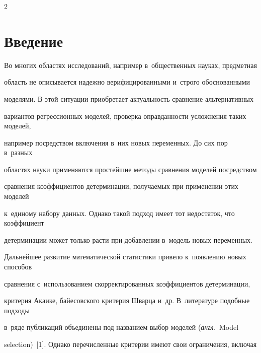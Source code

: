 \thispagestyle{headings}





\begin{multicols}{2}





\label{st\stat}


  


  


\section{Введение}





  Во многих областях исследований, например в~общественных науках, предметная 


область не описывается надежно верифицированными и~строго обоснованными 


моделями. В этой ситуации приобретает актуальность сравнение альтернативных 


вариантов регрессионных моделей, проверка оправданности усложнения таких моделей, 


например посредством включения в~них новых переменных. До сих пор в~разных 


областях науки применяются простейшие методы сравнения моделей посредством 


сравнения коэффициентов детерминации, получаемых при применении этих моделей 


к~единому набору данных. Однако такой подход имеет тот недостаток, что коэффициент 


детерминации может только расти при добавлении в~модель новых переменных. 





Дальнейшее развитие математической статистики привело к~появлению новых способов 


сравнения с~использованием скорректированных ко\-эффициентов детерминации, 


критерия Акаике, байесовского критерия Шварца и~др. В~литературе подобные подходы 


в~ряде публикаций объединены под названием выбор моделей (\textit{англ.}\ Model 


selection)~[1]. Однако перечисленные критерии имеют свои ограничения, включая 



\end{multicols}
